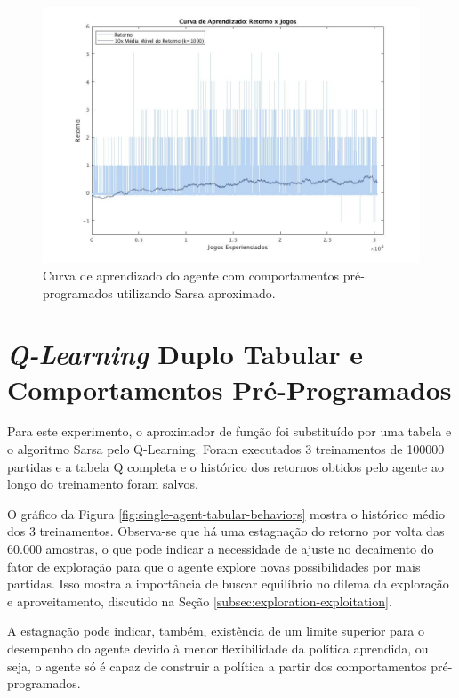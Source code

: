 \begin{figure}[H]
	\includegraphics[width=1\linewidth]{figs/curva-sarsa-1.jpg}
	\centering
	\caption{Curva de aprendizado do agente com comportamentos pré-programados utilizando Sarsa aproximado.}
	\label{fig:single-agent-sarsa-behaviors}
\end{figure}

\section{\textit{Q-Learning} Duplo Tabular e Comportamentos Pré-Programados}
\label{sec:behaviors-tabular}

Para este experimento, o aproximador de função foi substituído por uma tabela e o algoritmo Sarsa pelo Q-Learning. Foram executados 3 treinamentos de 100000 partidas e a tabela Q completa e o histórico dos retornos obtidos pelo agente ao longo do treinamento foram salvos.

O gráfico da Figura \ref{fig:single-agent-tabular-behaviors} mostra o histórico médio dos 3 treinamentos.
Observa-se que há uma estagnação do retorno por volta das 60.000 amostras, o que pode indicar a necessidade de ajuste no decaimento do fator de exploração para que o agente explore novas possibilidades por mais partidas. Isso mostra a importância de buscar equilíbrio no dilema da exploração e aproveitamento, discutido na Seção \ref{subsec:exploration-exploitation}.

A estagnação pode indicar, também, existência de um limite superior para o desempenho do agente devido à menor flexibilidade da política aprendida, ou seja, o agente só é capaz de construir a política a partir dos comportamentos pré-programados.


